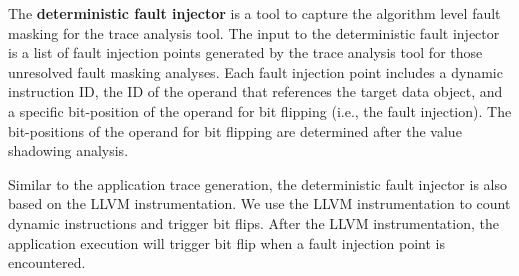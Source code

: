 The \textbf{deterministic fault injector} is a tool to capture the algorithm level fault masking
for the trace analysis tool.
The input to the deterministic fault injector is a list of fault injection points
generated by the trace analysis tool for those unresolved fault masking analyses.
Each fault injection point includes a dynamic instruction ID, %
the ID of the operand that references the target data object, and a specific bit-position of the operand for bit flipping (i.e., the fault injection).
The bit-positions of the operand for bit flipping are determined after the value shadowing analysis. %

Similar to the application trace generation, the deterministic fault injector is also based on the LLVM instrumentation. %
We use the LLVM instrumentation to count dynamic instructions and trigger bit flips. 
After the LLVM instrumentation, the application execution will trigger bit flip when a fault injection point is encountered.

\begin{comment}
(\textbf{Dong: the following part in this paragraph needs to be refined.})
The bit-locations of the operand for bit flipping are determined by the value shadowing threshold. %
Given a data value of the operand, the product of the data value and the value shadowing threshold
defines a boundary of the valid data value.
The bit-locations for bit flipping are those that have data values beyond 
the boundary after bit-flipping.
Those bit-locations for fault injection can cause large value deviation from the original data value, 
and we cannot determine fault masking using the statement-level and fault propagation analysis,
and have to rely on the analysis at the algorithm level.

Similar to the application trace generation, the deterministic fault injector is also based on LLVM instrumentation and dynamic LLVM IR.
We use the LLVM instrumentation to count dynamic instruction ID.
During the application execution, when a LLVM IR instruction specified in the list of fault injection points is to be executed,
we trigger a bit flip. 
\end{comment}


